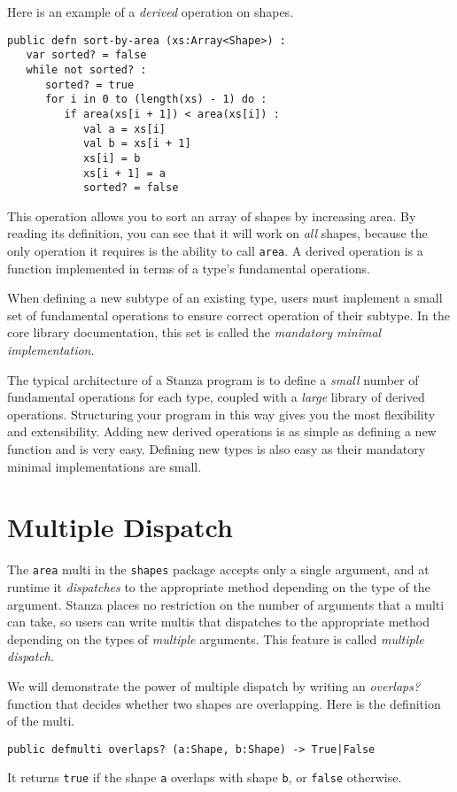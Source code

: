 \documentclass[10pt,oneside]{book}
\begin{document}
Here is an example of a {\em derived} operation on shapes.
\begin{lstlisting}
public defn sort-by-area (xs:Array<Shape>) :
   var sorted? = false
   while not sorted? :
      sorted? = true
      for i in 0 to (length(xs) - 1) do :
         if area(xs[i + 1]) < area(xs[i]) :
            val a = xs[i]
            val b = xs[i + 1]
            xs[i] = b
            xs[i + 1] = a
            sorted? = false      
\end{lstlisting}
This operation allows you to sort an array of shapes by increasing area. By reading its definition, you can see that it will work on {\em all} shapes, because the only operation it requires is the ability to call \texttt{\frenchspacing area}. A derived operation is a function implemented in terms of a type's fundamental operations. 

When defining a new subtype of an existing type, users must implement a small set of fundamental operations to ensure correct operation of their subtype. In the core library documentation, this set is called the {\em mandatory minimal implementation}. 

The typical architecture of a Stanza program is to define a {\em small} number of fundamental operations for each type, coupled with a {\em large} library of derived operations. Structuring your program in this way gives you the most flexibility and extensibility. Adding new derived operations is as simple as defining a new function and is very easy. Defining new types is also easy as their mandatory minimal implementations are small.

\section{Multiple Dispatch}
The \texttt{\frenchspacing area} multi in the \texttt{\frenchspacing shapes} package accepts only a single argument, and at runtime it {\em dispatches} to the appropriate method depending on the type of the argument. Stanza places no restriction on the number of arguments that a multi can take, so users can write multis that dispatches to the appropriate method depending on the types of {\em multiple} arguments. This feature is called {\em multiple dispatch}. 

We will demonstrate the power of multiple dispatch by writing an {\em overlaps?} function that decides whether two shapes are overlapping. Here is the definition of the multi.
\begin{lstlisting}
public defmulti overlaps? (a:Shape, b:Shape) -> True|False
\end{lstlisting}
It returns \texttt{\frenchspacing true} if the shape \texttt{\frenchspacing a} overlaps with shape \texttt{\frenchspacing b}, or \texttt{\frenchspacing false} otherwise.
\end{document}
